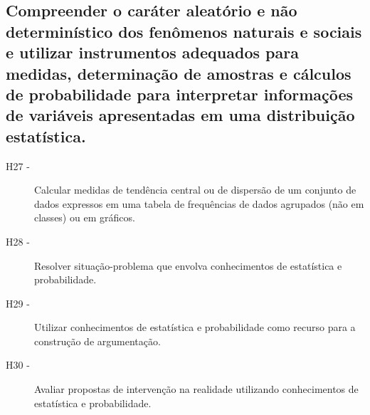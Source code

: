     \subsection*{Compreender o caráter aleatório e não determinístico dos fenômenos naturais e sociais e
    	utilizar instrumentos adequados para medidas, determinação de amostras e cálculos de probabilidade para
    	interpretar informações de variáveis apresentadas em uma distribuição estatística.}
    	\begin{description}
    		\item [H27 -]Calcular medidas de tendência central ou de dispersão de um conjunto de dados expressos em uma tabela de frequências de dados agrupados
    		(não em classes) ou em gráficos.
    		\item [H28 -]Resolver situação-problema que envolva conhecimentos de estatística e probabilidade.
    		\item [H29 -]Utilizar conhecimentos de estatística e probabilidade como recurso para a construção de argumentação.
    		\item [H30 -]Avaliar propostas de intervenção na realidade utilizando conhecimentos de estatística e probabilidade.
    	\end{description}
